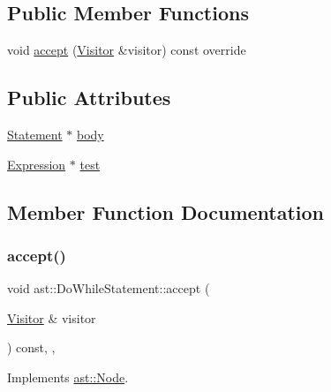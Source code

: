 \subsection*{Public Member Functions}
\begin{DoxyCompactItemize}
\item 
void \hyperlink{structast_1_1_do_while_statement_a829cc06274cc0a165e8e274a02a2d373}{accept} (\hyperlink{structast_1_1_visitor}{Visitor} \&visitor) const override
\end{DoxyCompactItemize}
\subsection*{Public Attributes}
\begin{DoxyCompactItemize}
\item 
\hyperlink{structast_1_1_statement}{Statement} $\ast$ \hyperlink{structast_1_1_do_while_statement_a7d1d10fa21fefab6f9ca82a7c88c7986}{body}
\item 
\hyperlink{structast_1_1_expression}{Expression} $\ast$ \hyperlink{structast_1_1_do_while_statement_a9191ed1c7a07db01694873c22e96f32c}{test}
\end{DoxyCompactItemize}


\subsection{Member Function Documentation}
\mbox{\label{structast_1_1_do_while_statement_a829cc06274cc0a165e8e274a02a2d373}} 
\subsubsection{\texorpdfstring{accept()}{accept()}}
{\footnotesize\ttfamily void ast\+::\+Do\+While\+Statement\+::accept (\begin{DoxyParamCaption}\item[{\hyperlink{structast_1_1_visitor}{Visitor} \&}]{visitor }\end{DoxyParamCaption}) const\hspace{0.3cm}{\ttfamily [inline]}, {\ttfamily [override]}, {\ttfamily [virtual]}}



Implements \hyperlink{structast_1_1_node_abc089ee6caaf06a4445ebdd8391fdebc}{ast\+::\+Node}.



